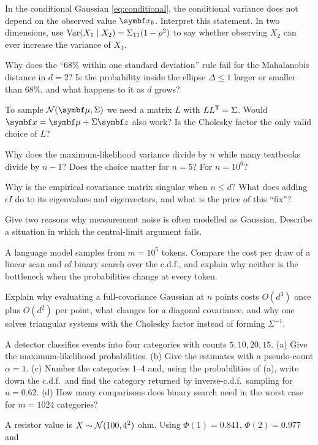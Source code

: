 \documentclass[11pt]{article}
\begin{document}
\begin{questions}
\begin{conceptual}
\item In the conditional Gaussian \eqref{eq:conditional}, the conditional variance does not depend on the observed value
$\x_b$. Interpret this statement. In two dimensions, use $\operatorname{Var}(X_1 \mid X_2) = \Sigma_{11}(1 - \rho^2)$ to say
whether observing $X_2$ can ever increase the variance of $X_1$.
\item Why does the ``68\% within one standard deviation'' rule fail for the Mahalanobis distance in $d = 2$? Is the
probability inside the ellipse $\Delta \le 1$ larger or smaller than 68\%, and what happens to it as $d$ grows?
\item To sample $\Normal(\vmu, \Sigma)$ we need a matrix $L$ with $LL^{\mathsf{T}} = \Sigma$. Would $\x = \vmu + \Sigma\vect{z}$
also work? Is the Cholesky factor the only valid choice of $L$?
\item Why does the maximum-likelihood variance divide by $n$ while many textbooks divide by $n - 1$? Does the choice
matter for $n = 5$? For $n = 10^6$?
\item Why is the empirical covariance matrix singular when $n \le d$? What does adding $\epsilon I$ do to its
eigenvalues and eigenvectors, and what is the price of this ``fix''?
\item Give two reasons why measurement noise is often modelled as Gaussian. Describe a situation in which the
central-limit argument fails.
\item A language model samples from $m = 10^5$ tokens. Compare the cost per draw of a linear scan and of binary search
over the c.d.f., and explain why neither is the bottleneck when the probabilities change at every token.
\item Explain why evaluating a full-covariance Gaussian at $n$ points costs $O(d^3)$ once plus $O(d^2)$ per point,
what changes for a diagonal covariance, and why one solves triangular systems with the Cholesky factor instead of
forming $\Sigma^{-1}$.
\end{conceptual}
\begin{calculations}
\item A detector classifies events into four categories with counts $5, 10, 20, 15$. (a) Give the maximum-likelihood
probabilities. (b) Give the estimates with a pseudo-count $\alpha = 1$. (c) Number the categories $1$--$4$ and,
using the probabilities of (a), write down the c.d.f.\ and find the category returned by inverse-c.d.f.\ sampling for $u = 0.62$. (d) How many comparisons does binary search need in the
worst case for $m = 1024$ categories?
\item A resistor value is $X \sim \mathcal{N}(100, 4^2)$ ohm. Using $\Phi(1) = 0.841$, $\Phi(2) = 0.977$ and

\end{calculations}
\end{questions}
\end{document}
